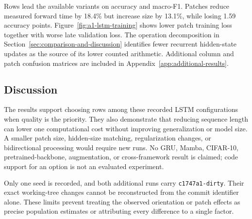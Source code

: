 Rows lead the available variants on accuracy and macro-F1. Patches reduce measured forward time by 18.4\% but increase size by 13.1\%, while losing 1.59 accuracy points. Figure~\ref{fig:a1-lstm-training} shows lower patch training loss together with worse late validation loss. The operation decomposition in Section~\ref{sec:comparison-and-discussion} identifies fewer recurrent hidden-state updates as the source of its lower counted arithmetic. Additional column and patch confusion matrices are included in Appendix~\ref{app:additional-results}.

\subsection{Discussion}

The results support choosing rows among these recorded LSTM configurations when quality is the priority. They also demonstrate that reducing sequence length can lower one computational cost without improving generalization or model size. A smaller patch size, hidden-size matching, regularization changes, or bidirectional processing would require new runs. No GRU, Mamba, CIFAR-10, pretrained-backbone, augmentation, or cross-framework result is claimed; code support for an option is not an evaluated experiment.

Only one seed is recorded, and both additional runs carry \texttt{c1747a1-dirty}. Their exact working-tree changes cannot be reconstructed from the commit identifier alone. These limits prevent treating the observed orientation or patch effects as precise population estimates or attributing every difference to a single factor.
